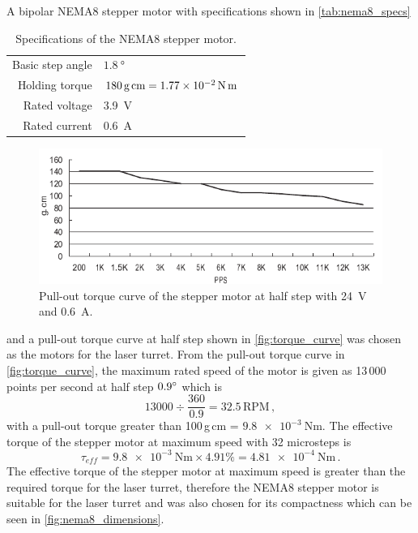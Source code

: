 A bipolar NEMA8 stepper motor with specifications shown in \autoref{tab:nema8_specs}
\begin{table}[h]
    \centering
    \begin{tabular}{rl}
        Basic step angle & $\SI{1.8}{\degree}$                               \\
        Holding torque   & $180\,\text{g\,cm} = \SI{1.77e-2}{\newton\meter}$ \\
        Rated voltage    & 3.9~V                                             \\
        Rated current    & 0.6~A                                             \\
    \end{tabular}
    \caption{Specifications of the NEMA8 stepper motor.}
    \label{tab:nema8_specs}
\end{table}
\begin{figure}[h]
    \centering
    \includegraphics[width=\textwidth]{figures/hardware_design/torque_curve.pdf}
    \caption{Pull-out torque curve of the stepper motor at half step with 24~V and 0.6~A.}
    \label{fig:torque_curve}
\end{figure}
and a pull-out torque curve at half step shown in \autoref{fig:torque_curve} was chosen as the motors for the laser turret. From the pull-out torque curve in \autoref{fig:torque_curve}, the maximum rated speed of the motor is given as 13\,000 points per second at half step $0.9^{\circ}$ which is
\begin{equation}
    \num{13000} \div \frac{360}{0.9} = 32.5\,\text{RPM}\,,
\end{equation}
with a pull-out torque greater than 100\,g\,cm = $\SI{9.8e-3}{\newton\meter}
$. The effective torque of the stepper motor at maximum speed with 32 microsteps is
\begin{equation}
    \tau_{eff} = \SI{9.8e-3}{\newton\meter} \times 4.91\% = \SI{4.81e-4}{\newton\meter}\,.
\end{equation}
The effective torque of the stepper motor at maximum speed is greater than the required torque for the laser turret, therefore the NEMA8 stepper motor is suitable for the laser turret and was also chosen for its compactness which can be seen in \autoref{fig:nema8_dimensions}.
